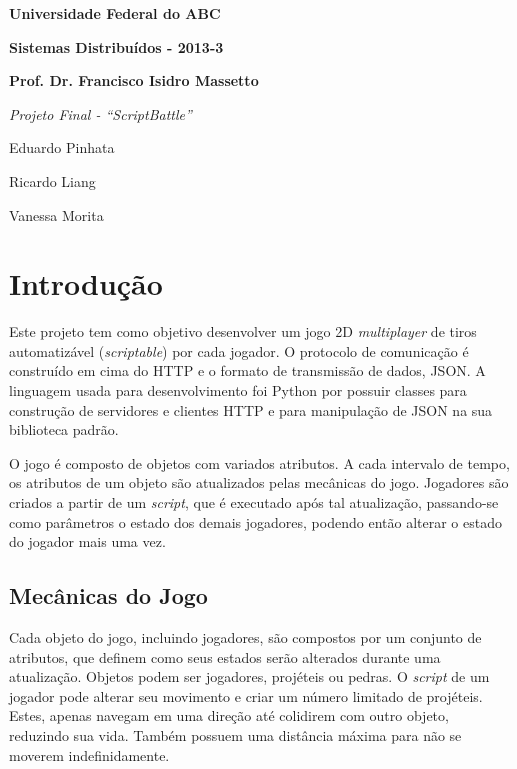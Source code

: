 \documentclass[12pt,a4paper]{article}
\begin{document}
\pagestyle{plain}

\begin{titlepage}
\begin{center}
	\textbf{{\large Universidade Federal do ABC}}

	\vfill

	\textbf{\large Sistemas Distribuídos - 2013-3}

	\textbf{\large Prof. Dr. Francisco Isidro Massetto}

	\textit{\Large Projeto Final - ``ScriptBattle''}

	\vfill

	\begin{flushright}
		\large Eduardo Pinhata

		\large Ricardo Liang

		\large Vanessa Morita
	\end{flushright}

	\vfill
\end{center}
\end{titlepage}

\tableofcontents

\pagebreak \section{Introdução}

Este projeto tem como objetivo desenvolver um jogo 2D \textit{multiplayer} de
tiros automatizável (\textit{scriptable}) por cada jogador. O protocolo de
comunicação é construído em cima do HTTP e o formato de transmissão de dados,
JSON. A linguagem usada para desenvolvimento foi Python por possuir classes
para construção de servidores e clientes HTTP e para manipulação de JSON na sua
biblioteca padrão.

O jogo é composto de objetos com variados atributos. A cada intervalo de tempo,
os atributos de um objeto são atualizados pelas mecânicas do jogo. Jogadores
são criados a partir de um \textit{script}, que é executado após tal
atualização, passando-se como parâmetros o estado dos demais jogadores, podendo
então alterar o estado do jogador mais uma vez.

\subsection{Mecânicas do Jogo}

Cada objeto do jogo, incluindo jogadores, são compostos por um conjunto de
atributos, que definem como seus estados serão alterados durante uma
atualização.  Objetos podem ser jogadores, projéteis ou pedras. O
\textit{script} de um jogador pode alterar seu movimento e criar um número
limitado de projéteis.  Estes, apenas navegam em uma direção até colidirem com
outro objeto, reduzindo sua vida. Também possuem uma distância máxima para não
se moverem indefinidamente.
\end{document}
